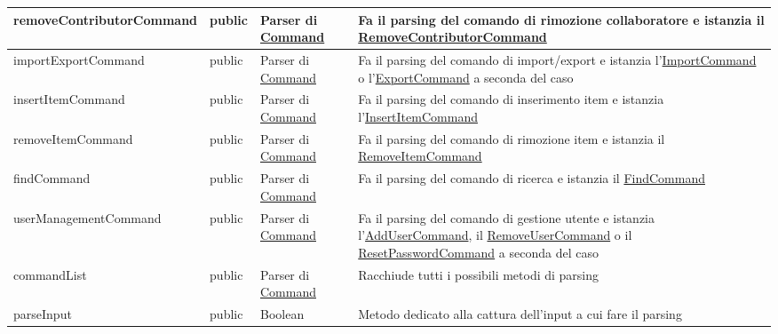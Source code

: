 \documentclass{scalatekids-article}
\begin{document}
\begin{tabular}{| p{5.5cm} | p{1.5cm} | p{2cm} | p{7.5cm} |}
  \hline
  removeContributorCommand & public & Parser di \hyperref[sec:actorbase::cli::models::Command]{Command} &
                                                                                                          Fa il parsing del comando di rimozione collaboratore e istanzia il \hyperref[sec:actorbase::cli::models::RemoveContributorCommand]{RemoveContributorCommand}\\
  \hline
  importExportCommand & public & Parser di \hyperref[sec:actorbase::cli::models::Command]{Command} & Fa il parsing del comando di import/export e istanzia l'\hyperref[sec:actorbase::cli::models::ImportCommand]{ImportCommand} o l'\hyperref[sec:actorbase::cli::models::ExportCommand]{ExportCommand} a seconda del caso\\
  \hline
  insertItemCommand & public & Parser di \hyperref[sec:actorbase::cli::models::Command]{Command} & Fa il parsing del comando di inserimento item e istanzia l'\hyperref[sec:actorbase::cli::models::InsertItemCommand]{InsertItemCommand}\\
  \hline
  removeItemCommand & public & Parser di \hyperref[sec:actorbase::cli::models::Command]{Command} &
                                                                                                   Fa il parsing del comando di rimozione item e istanzia il \hyperref[sec:actorbase::cli::models::RemoveItemCommand]{RemoveItemCommand}\\
  \hline
  findCommand & public & Parser di \hyperref[sec:actorbase::cli::models::Command]{Command} & Fa il parsing del comando di ricerca e istanzia il \hyperref[sec:actorbase::cli::models::FindCommand]{FindCommand}\\
  \hline
  userManagementCommand & public & Parser di \hyperref[sec:actorbase::cli::models::Command]{Command} & Fa il parsing del comando di gestione utente e istanzia l'\hyperref[sec:actorbase::cli::models::AddUserCommand]{AddUserCommand}, il \hyperref[sec:actorbase::cli::models::RemoveUserCommand]{RemoveUserCommand} o il \hyperref[sec:actorbase::cli::models::ResetPasswordCommand]{ResetPasswordCommand} a seconda del caso\\
  \hline
  commandList & public & Parser di \hyperref[sec:actorbase::cli::models::Command]{Command} & Racchiude tutti i possibili metodi di parsing\\
  \hline
  parseInput & public & Boolean & Metodo dedicato alla cattura dell'input a cui fare il parsing\\
  \hline
\end{tabular}
\end{document}
